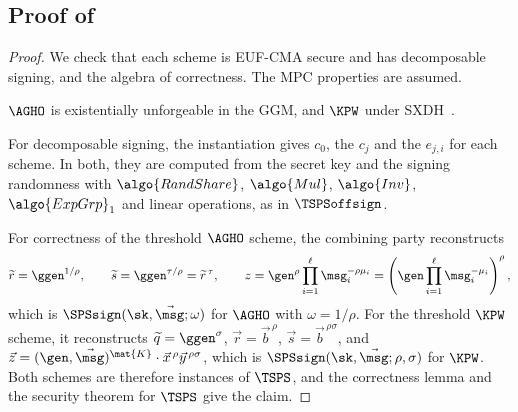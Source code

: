 \subsection{Proof of }

\begin{proof}

  We check that each scheme is EUF-CMA secure and has decomposable signing, and
the algebra of correctness. The MPC properties are assumed.

  $\AGHO$ is existentially unforgeable in the GGM, and $\KPW$ under
SXDH~\cite{C:AGHO11,C:KilPanWee15}.

  For decomposable signing, the instantiation gives $c_0$, the $c_j$ and the $e_{j,i}$ for each
scheme. In both, they are computed from the secret key and
the signing randomness with $\algo{RandShare}$, $\algo{Mul}$, $\algo{Inv}$,
$\algo{ExpGrp}_1$ and linear operations, as in $\TSPSoffsign$.

  For correctness of the threshold $\AGHO$ scheme, the combining party reconstructs
  \begin{equation*}
    \widetilde{r} = \ggen^{1/\rho}, \qquad \widetilde{s} = \ggen^{\tau/\rho} =
\widetilde{r}^{\,\tau}, \qquad z = \gen^{\rho} \prod_{i=1}^{\ell}
\msg_i^{-\rho\mu_i} = \left( \gen \prod_{i=1}^{\ell} \msg_i^{-\mu_i}
\right)^{\rho},
  \end{equation*}
  which is $\SPSsign(\sk, \vec{\msg}; \omega)$ for $\AGHO$ with $\omega = 1/\rho$.
For the threshold $\KPW$ scheme, it reconstructs $\widetilde{q} = \ggen^{\sigma}$,
$\vec{r} = \vec{b}^{\,\rho}$, $\vec{s} = \vec{b}^{\,\rho\sigma}$, and $\vec{z} =
(\gen, \vec{\msg})^{\mat{K}} \cdot \vec{x}^{\,\rho} \vec{y}^{\,\rho\sigma}$,
which is $\SPSsign(\sk, \vec{\msg}; \rho, \sigma)$ for $\KPW$. Both schemes are
therefore instances of $\TSPS$, and the correctness lemma and the security
theorem for $\TSPS$ give the claim.

\end{proof}
